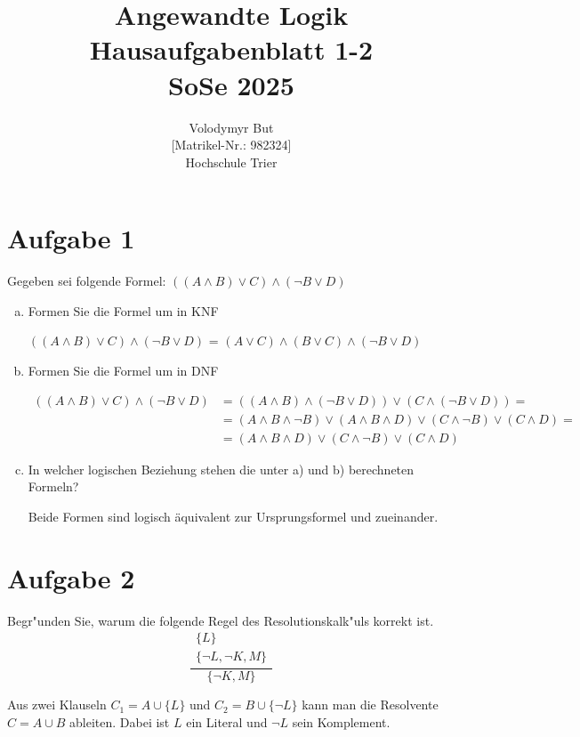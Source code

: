 \documentclass[10pt, oneside]{article}
\title{Angewandte Logik\\[15pt]\Large{Hausaufgabenblatt 1-2}\\[10pt]\Large{SoSe 2025}}
\author{Volodymyr But\\[5pt][Matrikel-Nr.: 982324]\\[10pt]Hochschule Trier}
\date{}
\begin{document}
\maketitle
\vspace{25px}

\section{Aufgabe 1}

Gegeben sei folgende Formel: $((A \land B) \lor C) \land (\lnot B \lor D)$
\begin{enumerate}[(a)]
    \item Formen Sie die Formel um in KNF

        $((A \land B) \lor C) \land (\lnot B \lor D)$ = $(A \lor C) \land (B \lor C) \land (\lnot B \lor D)$

    \item Formen Sie die Formel um in DNF

        $\begin{aligned}
            ((A \land B) \lor C) \land (\lnot B \lor D) &= ((A \land B) \land (\lnot B \lor D)) \lor (C \land (\lnot B \lor D)) = \\
                                                        &= (A \land B \land \lnot B) \lor (A \land B \land D) \lor (C \land \lnot B) \lor (C \land D) = \\
                                                        &= (A \land B \land D) \lor (C \land \lnot B) \lor (C \land D)
        \end{aligned}$

    \item In welcher logischen Beziehung stehen die unter a) und b) berechneten Formeln?

        Beide Formen sind logisch äquivalent zur Ursprungsformel und zueinander.
\end{enumerate}

\section{Aufgabe 2}

Begr"unden Sie, warum die folgende Regel des Resolutionskalk"uls korrekt ist.
\[
\frac{
    \begin{array}{c}
        \{L\} \\
        \{\neg L, \neg K, M\}
    \end{array}
}{\{\neg K, M\}}
\]

Aus zwei Klauseln $C_1 = A \cup \{L\}$ und $C_2 = B \cup \{\lnot L\}$ kann man
die Resolvente $C = A \cup B$ ableiten. Dabei ist $L$ ein Literal und $\lnot L$
sein Komplement.
\end{document}
